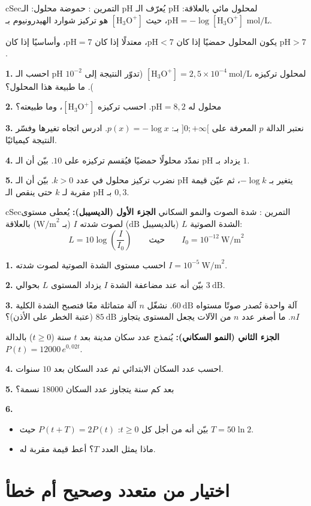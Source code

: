 \documentclass[12pt,a4paper]{article}
\newenvironment{BOX}[2]{\begin{otherlanguage}{english}\begin{arbox}{#1}{#2}}{\end{arbox}\end{otherlanguage}}
\newcounter{exo}
\newenvironment{tamrin}[1]{\stepcounter{exo}\begin{BOX}{cSec}{التمرين \theexo: #1}}{\end{BOX}}
\newenvironment{sq}{\begin{itemize}[leftmargin=2.4em,itemsep=3pt]}{\end{itemize}}
\newcommand{\qa}{\item[(أ)]}\newcommand{\qb}{\item[(ب)]}\newcommand{\qc}{\item[(جـ)]}\newcommand{\qd}{\item[(د)]}\newcommand{\qe}{\item[(هـ)]}
\newcommand{\QQ}[1]{\par\smallskip\textbf{#1.} }
\begin{document}
\begin{tamrin}{حموضة محلول: الـ pH}
يُعرّف الـ pH لمحلول مائي بالعلاقة: $\text{pH}=-\log\left[\text{H}_3\text{O}^+\right]$، حيث $\left[\text{H}_3\text{O}^+\right]$ هو تركيز شوارد الهيدرونيوم بـ $\text{mol/L}$.

يكون المحلول حمضيًا إذا كان $\text{pH}<7$، معتدلًا إذا كان $\text{pH}=7$، وأساسيًا إذا كان $\text{pH}>7$.
\QQ{1} احسب الـ pH لمحلول تركيزه $\left[\text{H}_3\text{O}^+\right]=2{,}5\times10^{-4}\ \text{mol/L}$ (تدوّر النتيجة إلى $10^{-2}$). ما طبيعة هذا المحلول؟
\QQ{2} محلول له $\text{pH}=8{,}2$. احسب تركيزه $\left[\text{H}_3\text{O}^+\right]$، وما طبيعته؟
\QQ{3} نعتبر الدالة $p$ المعرفة على $]0;+\infty[$ بـ: $p(x)=-\log x$. ادرس اتجاه تغيرها وفسّر النتيجة كيميائيًا.
\QQ{4} نمدّد محلولًا حمضيًا فيُقسم تركيزه على $10$. بيّن أن الـ pH يزداد بـ $1$.
\QQ{5} نضرب تركيز محلول في عدد $k>0$. بيّن أن الـ pH يتغير بـ $-\log k$، ثم عيّن قيمة مقربة لـ $k$ حتى ينقص الـ pH بـ $0{,}3$.
\end{tamrin}

\begin{tamrin}{شدة الصوت والنمو السكاني}
\textbf{الجزء الأول (الديسيبل):} يُعطى مستوى الشدة الصوتية $L$ (بالديسيبل $\text{dB}$) لصوت شدته $I$ (بـ $\text{W/m}^2$) بالعلاقة:
\[L=10\log\left(\frac{I}{I_0}\right)\qquad\text{حيث}\qquad I_0=10^{-12}\ \text{W/m}^2\]
\QQ{1} احسب مستوى الشدة الصوتية لصوت شدته $I=10^{-5}\ \text{W/m}^2$.
\QQ{2} بيّن أنه عند مضاعفة الشدة $I$ يزداد المستوى $L$ بحوالي $3\ \text{dB}$.
\QQ{3} آلة واحدة تُصدر صوتًا مستواه $60\ \text{dB}$. نشغّل $n$ آلة متماثلة معًا فتصبح الشدة الكلية $nI$. ما أصغر عدد $n$ من الآلات يجعل المستوى يتجاوز $85\ \text{dB}$ (عتبة الخطر على الأذن)؟

\textbf{الجزء الثاني (النمو السكاني):} يُنمذج عدد سكان مدينة بعد $t$ سنة ($t\geqslant0$) بالدالة $P(t)=12000\,e^{0{,}02t}$.
\QQ{4} احسب عدد السكان الابتدائي ثم عدد السكان بعد $10$ سنوات.
\QQ{5} بعد كم سنة يتجاوز عدد السكان $18000$ نسمة؟
\QQ{6}
\begin{sq}
\qa بيّن أنه من أجل كل $t\geqslant0$: $P(t+T)=2P(t)$ حيث $T=50\ln2$.
\qb ماذا يمثل العدد $T$؟ أعط قيمة مقربة له.
\end{sq}
\end{tamrin}

\section{اختيار من متعدد وصحيح أم خطأ}
\end{document}
